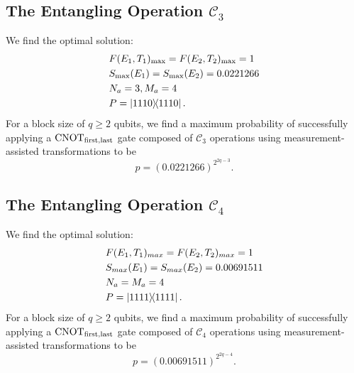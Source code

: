 \documentclass[aps,pra,twocolumn,showpacs,superscriptaddress,floatfix,10pt]{revtex4}
\begin{document}
\subsection{The Entangling Operation $\mathcal{C}_3$}
We find the optimal solution:
\begin{eqnarray}
& F(E_1,T_1)_{\rm max} = F(E_2,T_2)_{\rm max} = 1 \nonumber \\
& S_{\rm max}(E_1) = S_{\rm max}(E_2) = 0.0221266 \\
& N_a = 3,M_a=4 \nonumber \\
& P = \outerproduct{1110}{1110} .\nonumber	
\end{eqnarray}
For a block size of $q \ge 2 $ qubits, we find a maximum probability of successfully applying a $\mbox{CNOT}_{\rm first,last}$ gate composed of $\mathcal{C}_3$ operations  using measurement-assisted transformations to be
\begin{equation}
\label{1C4T Result}
p = (0.0221266)^{2^{2q-3}}.
\end{equation}
\subsection{The Entangling Operation $\mathcal{C}_4$}
We find the optimal solution:
 \begin{eqnarray}
 & F(E_1,T_1)_{max} = F(E_2,T_2)_{max} = 1 \nonumber\\
 & S_{max}(E_1) = S_{max}(E_2) = 0.00691511 \\
 & N_a = M_a=4 \nonumber\\
 & P = \outerproduct{1111}{1111}. \nonumber	
 \end{eqnarray}
For a block size of $q \ge 2$ qubits, we find a maximum probability of successfully applying a $\mbox{CNOT}_{\rm first,last}$ gate composed of $\mathcal{C}_4$ operations  using measurement-assisted transformations to be
 \begin{equation}
 \label{2C4T Result}
 p = (0.00691511)^{2^{2q-4}}.
 \end{equation}
\end{document}
